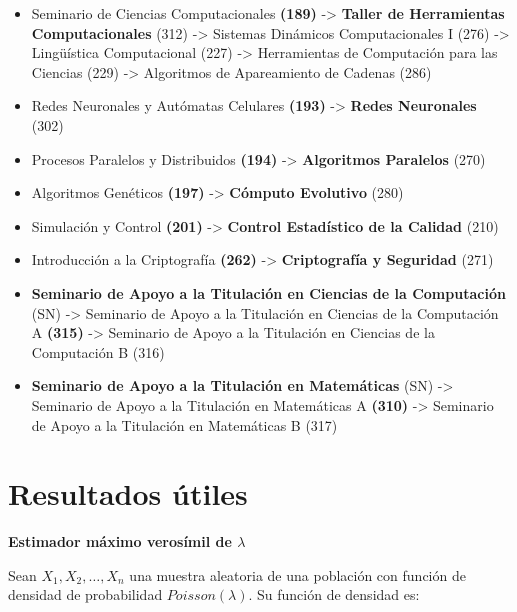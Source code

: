 \begin{appendices}
\begin{itemize}
  \item Seminario de Ciencias Computacionales \textbf{(189)} -> \textbf{Taller de Herramientas Computacionales} (312) -> Sistemas Dinámicos Computacionales I (276) -> Lingüística Computacional (227) -> Herramientas de Computación para las Ciencias (229) -> Algoritmos de Apareamiento de Cadenas (286)
  
  \item Redes Neuronales y Autómatas Celulares \textbf{(193)} -> \textbf{Redes Neuronales} (302)
  
  \item Procesos Paralelos y Distribuidos \textbf{(194)} -> \textbf{Algoritmos Paralelos} (270)
  
  \item Algoritmos Genéticos \textbf{(197)} -> \textbf{Cómputo Evolutivo} (280)
  
  \item Simulación y Control \textbf{(201)} -> \textbf{Control Estadístico de la Calidad} (210)
  
  \item Introducción a la Criptografía \textbf{(262)} -> \textbf{Criptografía y Seguridad} (271)
  
  \item \textbf{Seminario de Apoyo a la Titulación en Ciencias de la Computación} (SN) -> Seminario de Apoyo a la Titulación en Ciencias de la Computación A \textbf{(315)} -> Seminario de Apoyo a la Titulación en Ciencias de la Computación B (316)
  
  \item \textbf{Seminario de Apoyo a la Titulación en Matemáticas} (SN) -> Seminario de Apoyo a la Titulación en Matemáticas A \textbf{(310)} -> Seminario de Apoyo a la Titulación en Matemáticas B (317)
  \end{itemize}%



\chapter{Resultados útiles} \label{Apend_ResultadosUtiles}

\begin{defn} \label{EMVlambda}
\textbf{Estimador máximo verosímil de $\lambda$}

Sean $X_{1}, X_{2}, \ldots, X_{n}$ una muestra aleatoria de una población con función de densidad de probabilidad $Poisson(\lambda)$. Su función de densidad es:


\end{defn}
\end{appendices}
